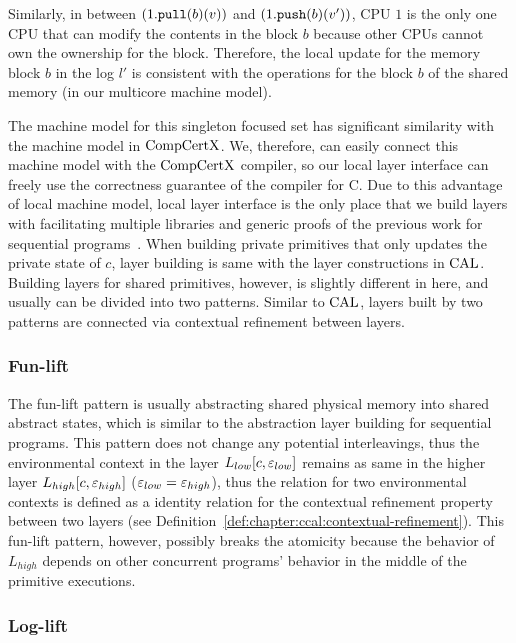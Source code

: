 Similarly,  in between $(1.{\mathrm{\texttt{pull}}}(b)(v))$ and $(1.{\mathrm{\texttt{push}}}(b)(v'))$, 
CPU $1$ is the only one CPU that can modify the contents in the block $b$
because other CPUs cannot own the ownership for the block.
Therefore, the local update for the memory block $b$ in the log $l'$ 
is consistent with the operations for the block $b$ of the shared memory (in our multicore machine model).

The machine model for this singleton focused set has significant similarity with the machine model in $\mathrm{CompCertX}$. 
We, therefore, can easily connect this machine model with the $\mathrm{CompCertX}$ compiler, 
so our local layer interface can freely use the correctness guarantee of the compiler for C. 
Due to this advantage of local machine model, local layer interface is the only place that we build layers with facilitating multiple libraries and generic proofs of the previous work for sequential programs~\cite{deepspec}. 
When building private primitives that only updates the private state of $c$, 
layer building is same with the layer constructions in $\mathrm{CAL}$.
Building layers for shared primitives, however, is slightly different in here, and usually can be divided into 
two patterns. 
Similar to $\mathrm{CAL}$, layers built by two patterns are connected via contextual refinement between layers. 

\subsubsection{Fun-lift}
The fun-lift pattern is usually abstracting shared physical memory into shared abstract states,
which is similar to the abstraction layer building for sequential programs.
This pattern does not change any potential interleavings, 
thus the environmental context in the layer $L_{low}[c, {\varepsilon}_{low}]$ remains 
as same in the higher layer $L_{high}[c, {\varepsilon}_{high}]$ (${\varepsilon}_{low} = {\varepsilon}_{high}$), thus the 
relation for two environmental contexts is defined as a identity relation 
for the contextual refinement property between two layers (see Definition~\ref{def:chapter:ccal:contextual-refinement}).
This fun-lift pattern, however, possibly breaks the atomicity because the behavior of $L_{high}$ depends on other concurrent programs’ behavior in the middle of the primitive executions. 

\subsubsection{Log-lift}

